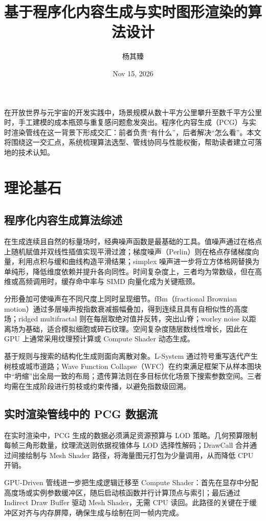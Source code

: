 \title{基于程序化内容生成与实时图形渲染的算法设计}
\author{杨其臻}
\date{Nov 15, 2026}
\maketitle
在开放世界与元宇宙的开发实践中，场景规模从数十平方公里攀升至数千平方公里时，手工建模的成本瓶颈与重复感问题愈发突出。程序化内容生成（PCG）与实时渲染管线在这一背景下形成交汇：前者负责“有什么”，后者解决“怎么看”。本文将围绕这一交汇点，系统梳理算法选型、管线协同与性能权衡，帮助读者建立可落地的技术认知。\par
\chapter{理论基石}
\section{程序化内容生成算法综述}
在生成连续且自然的标量场时，经典噪声函数是最基础的工具。值噪声通过在格点上随机赋值并双线性插值实现平滑过渡；梯度噪声（Perlin）则在格点存储梯度向量，利用点积与缓和曲线构造平滑结果；simplex 噪声进一步将立方体格网替换为单纯形，降低维度依赖并提升各向同性。时间复杂度上，三者均为常数级，但在高维或高频调用时，缓存命中率与 SIMD 向量化成为关键瓶颈。\par
分形叠加可使噪声在不同尺度上同时呈现细节。fBm（fractional Brownian motion）通过多层噪声按指数衰减振幅叠加，得到连续且具有自相似性的高度场；ridged multifractal 则在每层取绝对值并反转，突出山脊；worley noise 以距离场为基础，适合模拟细胞或碎石纹理。空间复杂度随层数线性增长，因此在 GPU 上通常采用纹理预计算或 Compute Shader 动态生成。\par
基于规则与搜索的结构化生成则面向离散对象。L-System 通过符号重写迭代产生树枝或城市道路；Wave Function Collapse（WFC）在约束满足框架下从样本图块中“坍缩”出全局一致的布局；遗传算法则在多目标优化场景下搜索参数空间。三者均需在生成阶段进行剪枝或约束传播，以避免指数级回溯。\par
\section{实时渲染管线中的 PCG 数据流}
在实时渲染中，PCG 生成的数据必须满足资源预算与 LOD 策略。几何预算限制每帧三角形数量，纹理流送则依据视锥体与 LOD 选择性解码；DrawCall 合并通过间接绘制与 Mesh Shader 路径，将海量图元打包为少量调用，从而降低 CPU 开销。\par
GPU-Driven 管线进一步把生成逻辑迁移至 Compute Shader：首先在显存中分配高度场或实例参数缓冲区，随后启动核函数并行计算顶点与索引；最后通过 Indirect Draw Buffer 驱动 Mesh Shader，无需 CPU 读回。此路径的关键在于缓冲区对齐与内存屏障，确保生成与绘制在同一帧内完成。\par
